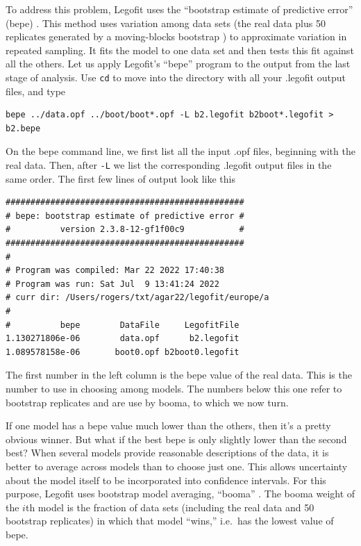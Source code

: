 \documentclass[11pt]{article}
\begin{document}
To address this problem, Legofit uses the ``bootstrap estimate of
predictive error'' (bepe)
\citep{Rogers:BMC-20-526,Efron:JAS-78-316,Efron:IB-93}. This method
uses variation among data sets (the real data plus 50 replicates
generated by a moving-blocks bootstrap \citep{Liu:ELB-92-225}) to
approximate variation in repeated sampling. It fits the model to one
data set and then tests this fit against all the others. Let us apply
Legofit's ``bepe'' program to the output from the last stage of
analysis. Use \texttt{cd} to move into the directory with all your
.legofit output files, and type
\begin{verbatim}
bepe ../data.opf ../boot/boot*.opf -L b2.legofit b2boot*.legofit > b2.bepe
\end{verbatim}
On the bepe command line, we first list all the input .opf files,
beginning with the real data. Then, after \texttt{-L} we list the
corresponding .legofit output files in the same order. The first few
lines of output look like this
\begin{verbatim}
################################################
# bepe: bootstrap estimate of predictive error #
#          version 2.3.8-12-gf1f00c9           #
################################################
#
# Program was compiled: Mar 22 2022 17:40:38
# Program was run: Sat Jul  9 13:41:24 2022
# curr dir: /Users/rogers/txt/agar22/legofit/europe/a
#
#          bepe        DataFile     LegofitFile
1.130271806e-06        data.opf      b2.legofit
1.089578158e-06       boot0.opf b2boot0.legofit
\end{verbatim}
The first number in the left column is the bepe value of the real
data. This is the number to use in choosing among models. The numbers
below this one refer to bootstrap replicates and are use by booma,
to which we now turn.

If one model has a bepe value much lower than the others, then it's a
pretty obvious winner. But what if the best bepe is only slightly
lower than the second best? When several models provide reasonable
descriptions of the data, it is better to average across models than
to choose just one. This allows uncertainty about the model itself to
be incorporated into confidence intervals. For this purpose, Legofit
uses bootstrap model averaging, ``booma''
\citep{Buckland:B-53-603,Rogers:BMC-20-526}. The booma weight of the
$i$th model is the fraction of data sets (including the real data and
50 bootstrap replicates) in which that model ``wins,'' i.e.\ has the
lowest value of bepe.
\end{document}
